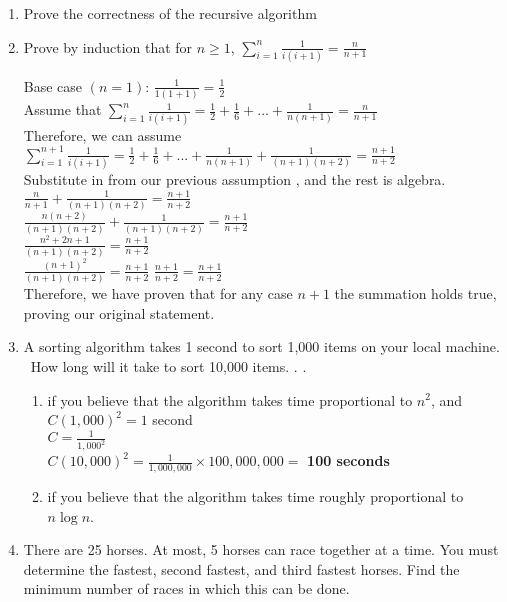 \documentclass[12pt]{article}
\begin{document}
\begin{enumerate}
\item Prove the correctness of the recursive algorithm

\vspace{0.1in}
\item Prove by induction that for $n \geq 1$, $\sum_{i=1} ^{n}{\frac{1}{i(i+1)}} = \frac{n}{n+1}$

Base case $(n=1)$: $\frac{1}{1(1+1)} = \frac{1}{2}$\\
Assume that $\sum_{i=1} ^{n}{\frac{1}{i(i+1)}} = \frac{1}{2} + \frac{1}{6} + . . . + \frac{1}{n(n+1)} = \frac{n}{n+1}$\\
Therefore, we can assume $\sum_{i=1} ^{n+1}{\frac{1}{i(i+1)}} = \frac{1}{2} + \frac{1}{6} + . . . + \frac{1}{n(n+1)} + \frac{1}{(n+1)(n+2)}= \frac{n+1}{n+2}$\\
Substitute in from our previous assumption , and the rest is algebra.\\

$\frac{n}{n+1} + \frac{1}{(n+1)(n+2)}= \frac{n+1}{n+2}$\\
$\frac{n(n+2)}{(n+1)(n+2)} + \frac{1}{(n+1)(n+2)}= \frac{n+1}{n+2}$\\
$\frac{n^2+2n+1}{(n+1)(n+2)}= \frac{n+1}{n+2}$\\
$\frac{(n+1)^2}{(n+1)(n+2)}= \frac{n+1}{n+2}$
$\frac{n+1}{n+2} = \frac{n+1}{n+2}$\\

Therefore, we have proven that for any case $n+1$ the summation holds true, proving our original statement.
\vspace{0.1in}
\item A sorting algorithm takes 1 second to sort 1,000 items on your local machine. \ 
How long will it take to sort 10,000 items. . .
    \begin{enumerate}
        \item if you believe that the algorithm takes time proportional to $n^2$, and\vspace{0.05in}\\
            $C(1,000)^2=1$ second \vspace{0.05in}\\
            $C = \frac{1}{1,000^2}$ \vspace{0.05in}\\
            $C(10,000)^2 = \frac{1}{1,000,000} \times 100,000,000 =$ {\bf 100 seconds} \\
        \item if you believe that the algorithm takes time roughly proportional to $n \log n$.
    \end{enumerate}
\item There are 25 horses. At most, 5 horses can race together at a time. You must
determine the fastest, second fastest, and third fastest horses. Find the minimum
number of races in which this can be done.


\end{enumerate}
\end{document}
